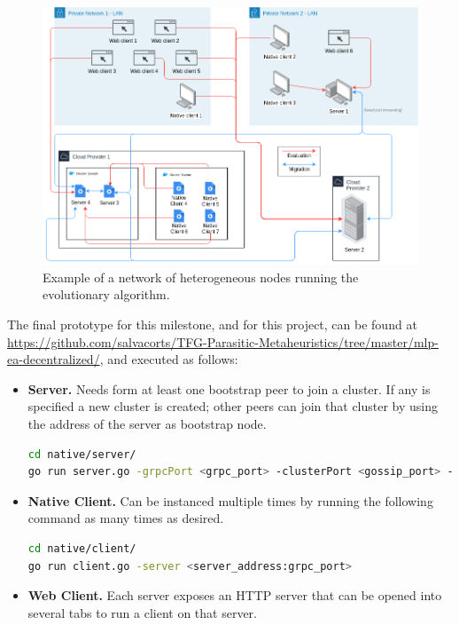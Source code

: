 \begin{figure}[h!]
		\centering
    	\includegraphics[width=\linewidth]{assets/images/tfg-net.png}
    	\caption{Example of a network of heterogeneous nodes running the evolutionary algorithm.}
    	\label{fig:tfg-net}
\end{figure}

The final prototype for this milestone, and for this project, can be found at \href{github.com/salvacorts/TFG-Parasitic-Metaheuristics/tree/master/mlp-ea-centralized/common}{https://github.com/salvacorts/TFG-Parasitic-Metaheuristics/tree/master/mlp-ea-decentralized/}, and executed as follows:

\begin{itemize}
	\item \textbf{Server.} Needs form at least one bootstrap peer to join a cluster. If any is specified a new cluster is created; other peers can join that cluster by using the address of the server as bootstrap node.
\begin{lstlisting}[language=bash]
cd native/server/
go run server.go -grpcPort <grpc_port> -clusterPort <gossip_port> -clusterBoostrap <peer1_addr:peer1_gossip_port,peer2_addr:peer2_gossip_port>
\end{lstlisting}

	\item \textbf{Native Client.} Can be instanced multiple times by running the following command as many times as desired.
\begin{lstlisting}[language=bash]
cd native/client/
go run client.go -server <server_address:grpc_port>
\end{lstlisting}

	\item \textbf{Web Client.} Each server exposes an HTTP server that can be opened into several tabs to run a client on that server.
\end{itemize}

